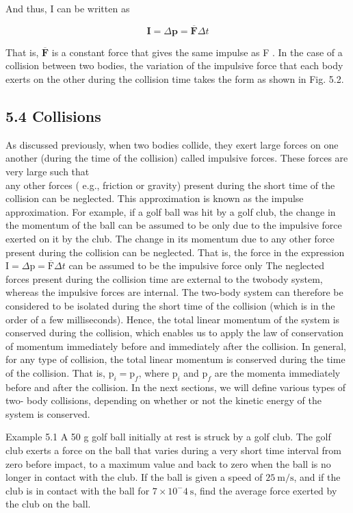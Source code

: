 \documentclass[10pt]{article}
\begin{document}
And thus, I can be written as

$$
\mathbf{I}=\Delta \mathbf{p}=\overline{\mathbf{F}} \Delta t
$$

That is, $\overline{\mathbf{F}}$ is a constant force that gives the same impulse as F . In the case of a collision between two bodies, the variation of the impulsive force that each body exerts on the other during the collision time takes the form as shown in Fig. 5.2.

\subsection*{5.4 Collisions}
As discussed previously, when two bodies collide, they exert large forces on one another (during the time of the collision) called impulsive forces. These forces are very large such that\\
any other forces ( e.g., friction or gravity) present during the short time of the collision can be neglected. This approximation is known as the impulse approximation. For example, if a golf ball was hit by a golf club, the change in the momentum of the ball can be assumed to be only due to the impulsive force exerted on it by the club. The change in its momentum due to any other force present during the collision can be neglected. That is, the force in the expression $\mathrm{I}=\Delta \mathrm{p}=\overline{\mathrm{F}} \Delta t$ can be assumed to be the impulsive force only The neglected forces present during the collision time are external to the twobody system, whereas the impulsive forces are internal. The two-body system can therefore be considered to be isolated during the short time of the collision (which is in the order of a few milliseconds). Hence, the total linear momentum of the system is conserved during the collision, which enables us to apply the law of conservation of momentum immediately before and immediately after the collision. In general, for any type of collision, the total linear momentum is conserved during the time of the collision. That is, $\mathrm{p}_{i}=\mathrm{p}_{f}$, where $\mathrm{p}_{i}$ and $\mathrm{p}_{f}$ are the momenta immediately before and after the collision. In the next sections, we will define various types of two- body collisions, depending on whether or not the kinetic energy of the system is conserved.

Example 5.1 A 50 g golf ball initially at rest is struck by a golf club. The golf club exerts a force on the ball that varies during a very short time interval from zero before impact, to a maximum value and back to zero when the ball is no longer in contact with the club. If the ball is given a speed of $25 \mathrm{~m} / \mathrm{s}$, and if the club is in contact with the ball for $7 \times 10^{-} 4 \mathrm{~s}$, find the average force exerted by the club on the ball.
\end{document}
